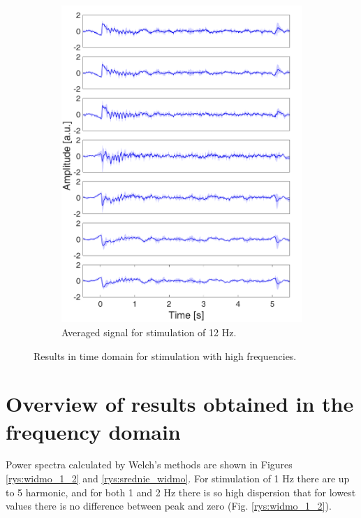 \documentclass{pracalicmgr}
\begin{document}
\begin{figure}[H]
\begin{subfigure}{.5\textwidth}
	\includegraphics[width=1.\linewidth]{srednie_12Hz_5s.png}
	\caption{Averaged signal for stimulation of 12 Hz.}
	\label{rys:srednie_12Hz}
	\end{subfigure}
	\caption{Results in time domain for stimulation with high frequencies.}
	\label{rys:srednia_czas}
		
	\end{figure}
	
    \section{Overview of results obtained in the frequency domain}
    \label{sec:freq}
    
    Power spectra calculated by Welch's methods are shown in Figures \ref{rys:widmo_1_2} and \ref{rys:srednie_widmo}. For stimulation of 1 Hz there are up to 5 harmonic, and for both 1 and 2 Hz there is so high dispersion that for lowest values there is no difference between peak and zero (Fig. \ref{rys:widmo_1_2}).     
    
\end{document}
